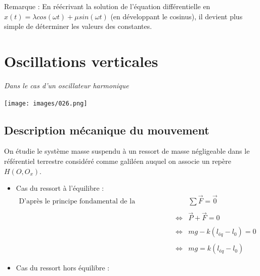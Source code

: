\documentclass[a4paper,10pt]{book}
\begin{document}
Remarque : En réécrivant la solution de l'équation différentielle en $x(t)=\lambda cos(\omega t)+\mu sin(\omega t)$ (en développant le cosinus), il devient plus simple de déterminer les valeurs des constantes.

\begin{center}  \end{center}

\section{Oscillations verticales}
\textit{Dans le cas d'un oscillateur harmonique}
\begin{center}\texttt{[image: images/026.png]}\end{center}
\subsection{Description mécanique du mouvement}
On étudie le système {masse} suspendu à un ressort de masse négligeable dans le référentiel terrestre considéré comme galiléen auquel on associe un repère $H(O,O_{x})$.\\

\begin{itemize}
\item Cas du ressort à l'équilibre :\\

$\begin{array}{rcl}\text{D'après le principe fondamental de la dynamique on a } &&\sum \vec{F}=\vec{0}\\\\
&\Leftrightarrow& \vec{P}+\vec{F}=0\\\\
&\Leftrightarrow& mg-k(l_{éq}-l_{0})=0\\\\
&\Leftrightarrow& mg=k(l_{éq}-l_{0})\end{array}$ \bigskip

\item Cas du ressort hors équilibre :\\ \end{itemize}
\end{document}
